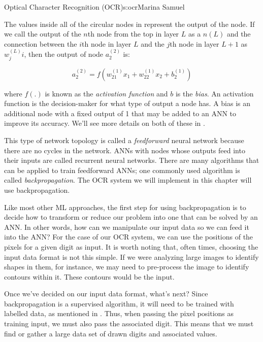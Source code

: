 \begin{aosachapter}{Optical Character Recognition (OCR)}{s:ocr}{Marina Samuel}

The values inside all of the circular nodes in 
represent the output of the node. If we call the output of the $n$th
node from the top in layer $L$ as a $n(L)$ and the connection between
the $i$th node in layer $L$ and the $j$th node in layer $L+1$ as
$w^{(L)}_ji$, then the output of node $a^{(2)}_2$ is:

\[
a^{(2)}_2 = f(w^{(1)}_{21}x_1 + w^{(1)}_{22}x_2 + b^{(1)}_{2})
\]

where $f(.)$ is known as the \emph{activation function} and $b$ is the
\emph{bias}. An activation function is the decision-maker for what type
of output a node has. A bias is an additional node with a fixed output
of 1 that may be added to an ANN to improve its accuracy. We'll see more
details on both of these in .

This type of network topology is called a \emph{feedforward} neural
network because there are no cycles in the network. ANNs with nodes
whose outputs feed into their inputs are called recurrent neural
networks. There are many algorithms that can be applied to train
feedforward ANNs; one commonly used algorithm is called
\emph{backpropagation}. The OCR system we will implement in this chapter
will use backpropagation.

\label{how-do-we-use-anns}

Like most other ML approaches, the first step for using backpropagation
is to decide how to transform or reduce our problem into one that can be
solved by an ANN. In other words, how can we manipulate our input data
so we can feed it into the ANN? For the case of our OCR system, we can
use the positions of the pixels for a given digit as input. It is worth
noting that, often times, choosing the input data format is not this
simple. If we were analyzing large images to identify shapes in them,
for instance, we may need to pre-process the image to identify contours
within it. These contours would be the input.

Once we've decided on our input data format, what's next? Since
backpropagation is a supervised algorithm, it will need to be trained
with labelled data, as mentioned in . Thus, when
passing the pixel positions as training input, we must also pass the
associated digit. This means that we must find or gather a large data
set of drawn digits and associated values.


\end{aosachapter}
